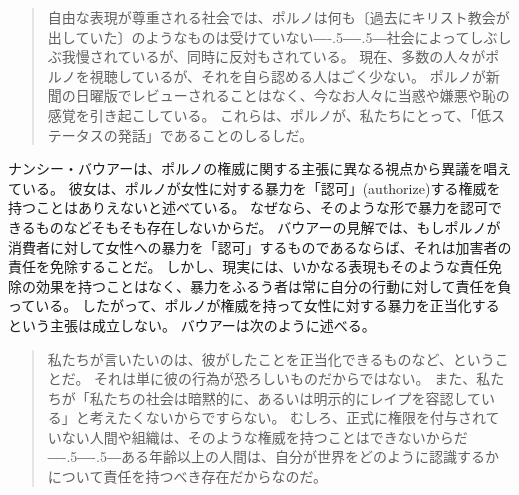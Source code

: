 \documentclass[paper=a4,book,openany]{jlreq}
\def\DDASH{―\kern-.5\zw―\kern-.5\zw―} %
\begin{document}
\begin{quote}
自由な表現が尊重される社会では、ポルノは何も〔過去にキリスト教会が出していた〕のようなものは受けていない{\DDASH}社会によってしぶしぶ我慢されているが、同時に反対もされている。
現在、多数の人々がポルノを視聴しているが、それを自ら認める人はごく少ない。
ポルノが新聞の日曜版でレビューされることはなく、今なお人々に当惑や嫌悪や恥の感覚を引き起こしている。
これらは、ポルノが、私たちにとって、「低ステータスの発話」であることのしるしだ。
\citep[pp.296--297]{green98:_pornog_subor_silen}
\end{quote}

ナンシー・バウアーは、ポルノの権威に関する主張に異なる視点から異議を唱えている。
彼女は、ポルノが女性に対する暴力を「認可」(authorize)する権威を持つことはありえないと述べている。
なぜなら、そのような形で暴力を認可できるものなどそもそも存在しないからだ。
バウアーの見解では、もしポルノが消費者に対して女性への暴力を「認可」するものであるならば、それは加害者の責任を免除することだ。
しかし、現実には、いかなる表現もそのような責任免除の効果を持つことはなく、暴力をふるう者は常に自分の行動に対して責任を負っている。
したがって、ポルノが権威を持って女性に対する暴力を正当化するという主張は成立しない。
バウアーは次のように述べる。

\begin{quote}
私たちが言いたいのは、彼がしたことを正当化できるものなど、ということだ。
それは単に彼の行為が恐ろしいものだからではない。
また、私たちが「私たちの社会は暗黙的に、あるいは明示的にレイプを容認している」と考えたくないからですらない。
むしろ、正式に権限を付与されていない人間や組織は、そのような権威を持つことはできないからだ{\DDASH}ある年齢以上の人間は、自分が世界をどのように認識するかについて責任を持つべき存在だからなのだ。
\citep[pp.86--87]{bauer06:_how_do_thing_pornog}
\end{quote}
\end{document}
